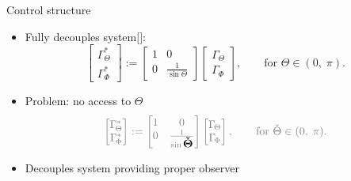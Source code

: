 \documentclass{beamer}
\begin{document}
\begin{frame}{Control structure}
\begin{itemize}
\begin{itemize}
		\item \small Fully decouples system$[$\cite{Monsieurs2015}$]$:
		\begin{equation*}
					\begin{bmatrix}
					\Gamma_{\!\Theta}^* \\ \Gamma_{\!\Phi}^* 	
					\end{bmatrix} :=  \begin{bmatrix} 1 & 0 \\ 0 & \frac{1}{\sin \Theta}\end{bmatrix} \begin{bmatrix}\Gamma_{\!\Theta} \\ \Gamma_{\!\Phi} \end{bmatrix}, \qquad \text{for } \Theta\in (0,\; \pi).
					\nonumber
		\end{equation*}
		\item Problem: no access to $\Theta$
		\begin{equation*}
					\color{gray}\begin{bmatrix}
					\Gamma_{\!\Theta}^* \\ \Gamma_{\!\Phi}^* 	
					\end{bmatrix} :=  \begin{bmatrix} 1 & 0 \\ 0 & \frac{1}{\sin \color{black}\mathlarger{\mathlarger{\boldsymbol{\check{\Theta}}}}}\color{gray}\end{bmatrix} \begin{bmatrix}\Gamma_{\!\Theta} \\ \Gamma_{\!\Phi} \end{bmatrix}, \qquad \text{for } \check{\Theta}\in (0,\; \pi).
					\nonumber
		\end{equation*}
		\item Decouples system providing proper observer
	\end{itemize}
\end{itemize}
\end{frame}
			
\end{document}
